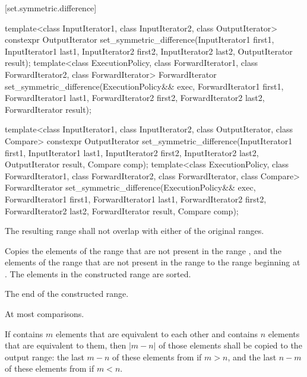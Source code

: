 [set.symmetric.difference]{}

%
\begin{itemdecl}
template<class InputIterator1, class InputIterator2,
         class OutputIterator>
  constexpr OutputIterator
    set_symmetric_difference(InputIterator1 first1, InputIterator1 last1,
                             InputIterator2 first2, InputIterator2 last2,
                             OutputIterator result);
template<class ExecutionPolicy, class ForwardIterator1, class ForwardIterator2,
         class ForwardIterator>
  ForwardIterator
    set_symmetric_difference(ExecutionPolicy&& exec,
                             ForwardIterator1 first1, ForwardIterator1 last1,
                             ForwardIterator2 first2, ForwardIterator2 last2,
                             ForwardIterator result);

template<class InputIterator1, class InputIterator2,
         class OutputIterator, class Compare>
  constexpr OutputIterator
    set_symmetric_difference(InputIterator1 first1, InputIterator1 last1,
                             InputIterator2 first2, InputIterator2 last2,
                             OutputIterator result, Compare comp);
template<class ExecutionPolicy, class ForwardIterator1, class ForwardIterator2,
         class ForwardIterator, class Compare>
  ForwardIterator
    set_symmetric_difference(ExecutionPolicy&& exec,
                             ForwardIterator1 first1, ForwardIterator1 last1,
                             ForwardIterator2 first2, ForwardIterator2 last2,
                             ForwardIterator result, Compare comp);
\end{itemdecl}

\begin{itemdescr}
\pnum
\requires
The resulting range shall not overlap with either of the original ranges.

\pnum
\effects
Copies the elements of the range
that are not present in the range
,
and the elements of the range
that are not present in the range
to the range beginning at
.
The elements in the constructed range are sorted.

\pnum
\returns
The end of the constructed range.

\pnum
\complexity
At most
comparisons.

\pnum
\remarks
If  contains $m$ elements that are equivalent to each other and
 contains $n$ elements that are equivalent to them, then
$|m - n|$ of those elements shall be copied to the output range: the last
$m - n$ of these elements from  if $m > n$, and the last
$n - m$ of these elements from  if $m < n$.
\end{itemdescr}

